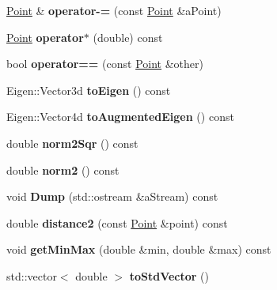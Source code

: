 \begin{DoxyCompactItemize}
\item 
\hypertarget{classcpcr_1_1Point_a809867719e326977963243b3d2e1e6b8}{\hyperlink{classcpcr_1_1Point}{Point} \& {\bfseries operator-\/=} (const \hyperlink{classcpcr_1_1Point}{Point} \&a\-Point)}\label{classcpcr_1_1Point_a809867719e326977963243b3d2e1e6b8}

\item 
\hypertarget{classcpcr_1_1Point_aa964fe220933ab96bec7d2bb07fbee23}{\hyperlink{classcpcr_1_1Point}{Point} {\bfseries operator$\ast$} (double) const }\label{classcpcr_1_1Point_aa964fe220933ab96bec7d2bb07fbee23}

\item 
\hypertarget{classcpcr_1_1Point_a6b055fc8fb84a4b168fe0fda34f2a540}{bool {\bfseries operator==} (const \hyperlink{classcpcr_1_1Point}{Point} \&other)}\label{classcpcr_1_1Point_a6b055fc8fb84a4b168fe0fda34f2a540}

\item 
\hypertarget{classcpcr_1_1Point_a2caa7b00e7faf988ad3bbf98fc38975f}{Eigen\-::\-Vector3d {\bfseries to\-Eigen} () const }\label{classcpcr_1_1Point_a2caa7b00e7faf988ad3bbf98fc38975f}

\item 
\hypertarget{classcpcr_1_1Point_a08544ae3c2ede042658a1b0686751db1}{Eigen\-::\-Vector4d {\bfseries to\-Augmented\-Eigen} () const }\label{classcpcr_1_1Point_a08544ae3c2ede042658a1b0686751db1}

\item 
\hypertarget{classcpcr_1_1Point_a0f2a9aa4650c31abd11fe6d7f838782b}{double {\bfseries norm2\-Sqr} () const }\label{classcpcr_1_1Point_a0f2a9aa4650c31abd11fe6d7f838782b}

\item 
\hypertarget{classcpcr_1_1Point_a224f737024962d348b886535e92c6128}{double {\bfseries norm2} () const }\label{classcpcr_1_1Point_a224f737024962d348b886535e92c6128}

\item 
\hypertarget{classcpcr_1_1Point_a4c465336da011dd6827fa62aeda3e086}{void {\bfseries Dump} (std\-::ostream \&a\-Stream) const }\label{classcpcr_1_1Point_a4c465336da011dd6827fa62aeda3e086}

\item 
\hypertarget{classcpcr_1_1Point_a89999df9f974c8c2b250b3d7547be4ca}{double {\bfseries distance2} (const \hyperlink{classcpcr_1_1Point}{Point} \&point) const }\label{classcpcr_1_1Point_a89999df9f974c8c2b250b3d7547be4ca}

\item 
\hypertarget{classcpcr_1_1Point_aae866ac18021b8bd4f85d114afe87d3c}{void {\bfseries get\-Min\-Max} (double \&min, double \&max) const }\label{classcpcr_1_1Point_aae866ac18021b8bd4f85d114afe87d3c}

\item 
\hypertarget{classcpcr_1_1Point_a43e4302201a34a2b20767470039e7979}{std\-::vector$<$ double $>$ {\bfseries to\-Std\-Vector} ()}\label{classcpcr_1_1Point_a43e4302201a34a2b20767470039e7979}

\end{DoxyCompactItemize}
